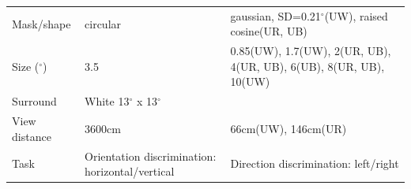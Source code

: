 \documentclass[]{article}
\begin{document}
\begin{longtable}[]{@{}lll@{}}
\begin{minipage}[t]{0.15\columnwidth}
Mask/shape\strut
\end{minipage} & \begin{minipage}[t]{0.13\columnwidth}\raggedright\strut
circular\strut
\end{minipage} & \begin{minipage}[t]{0.11\columnwidth}\raggedright\strut
gaussian, SD=0.21\(^{\circ}\)(UW), raised cosine(UR, UB)\strut
\end{minipage}\tabularnewline
\begin{minipage}[t]{0.15\columnwidth}\raggedright\strut
Size (\(^{\circ}\))\strut
\end{minipage} & \begin{minipage}[t]{0.13\columnwidth}\raggedright\strut
3.5\strut
\end{minipage} & \begin{minipage}[t]{0.11\columnwidth}\raggedright\strut
0.85(UW), 1.7(UW), 2(UR, UB), 4(UR, UB), 6(UB), 8(UR, UB), 10(UW)\strut
\end{minipage}\tabularnewline
\begin{minipage}[t]{0.15\columnwidth}\raggedright\strut
Surround\strut
\end{minipage} & \begin{minipage}[t]{0.13\columnwidth}\raggedright\strut
White 13\(^{\circ}\) x 13\(^{\circ}\)\strut
\end{minipage} & \begin{minipage}[t]{0.11\columnwidth}\raggedright\strut
\strut
\end{minipage}\tabularnewline
\begin{minipage}[t]{0.15\columnwidth}\raggedright\strut
View distance\strut
\end{minipage} & \begin{minipage}[t]{0.13\columnwidth}\raggedright\strut
3600cm\strut
\end{minipage} & \begin{minipage}[t]{0.11\columnwidth}\raggedright\strut
66cm(UW), 146cm(UR)\strut
\end{minipage}\tabularnewline
\begin{minipage}[t]{0.15\columnwidth}\raggedright\strut
Task\strut
\end{minipage} & \begin{minipage}[t]{0.13\columnwidth}\raggedright\strut
Orientation discrimination: horizontal/vertical\strut
\end{minipage} & \begin{minipage}[t]{0.11\columnwidth}\raggedright\strut
Direction discrimination: left/right\strut

\end{minipage}
\end{longtable}
\end{document}
